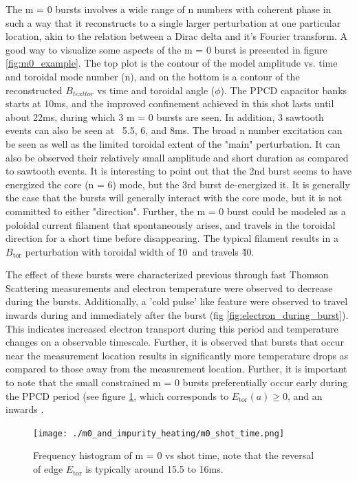 The m = 0 bursts involves a wide range of n numbers with coherent phase in such a way that it reconstructs to a single larger perturbation at one particular location, akin to the relation between a Dirac delta and it's Fourier transform. A good way to visualize some aspects of the m = 0 burst is presented in figure \ref{fig:m0_example}. The top plot is the contour of the model amplitude vs. time and toroidal mode number (n), and on the bottom is a contour of the reconstructed $B_{text{tor}}$ vs time and toroidal angle ($\phi$). The PPCD capacitor banks starts at 10ms, and the improved confinement achieved in this shot lasts until about 22ms, during which 3 m = 0 bursts are seen. In addition, 3 sawtooth events can also be seen at ~5.5, 6, and 8ms. The broad n number excitation can be seen as well as the limited toroidal extent of the "main" perturbation. It can also be observed their relatively small amplitude and short duration as compared to sawtooth events. It is interesting to point out that the 2nd burst seems to have energized the core (n = 6) mode, but the 3rd burst de-energized it. It is generally the case that the bursts will generally interact with the core mode, but it is not committed to either "direction". Further, the m = 0 burst could be modeled as a poloidal current filament that spontaneously arises, and travels in the toroidal direction for a short time before disappearing\cite{Piovesan2008}. The typical filament results in a $B_{\text{tor}}$ perturbation with toroidal width of \~10\textdegree\ and travels \~40\textdegree. 

The effect of these bursts were characterized previous through fast Thomson Scattering measurements and electron temperature were observed to decrease during the bursts. Additionally, a 'cold pulse' like feature were observed to travel inwards during and immediately after the burst (fig \ref{fig:electron_during_burst}). This indicates increased electron transport during this period and temperature changes on a observable timescale. Further, it is observed that bursts that occur near the measurement location results in significantly more temperature drops as compared to those away from the measurement location. Further, it is important to note that the small constrained m = 0 bursts preferentially occur early during the PPCD period (see figure \ref{fig:m0_shot_time}, which corresponds to $E_\text{tor}(a) \geq 0 $, and an inwards \ecb.

\begin{figure}
	\centering
	\texttt{[image: ./m0\_and\_impurity\_heating/m0\_shot\_time.png]}
	\caption{Frequency histogram of m = 0 vs shot time, note that the reversal of edge $E_\text{tor}$ is typically around 15.5 to 16ms.}\label{fig:m0_shot_time}
\end{figure}

